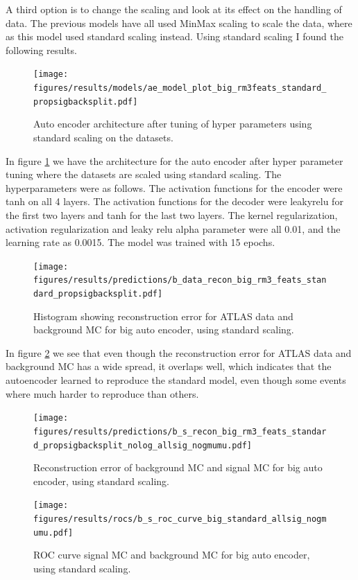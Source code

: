 \documentclass[ reprint, amsmath,amssymb, aps, nofootinbib]{revtex4-2}
\begin{document}
A third option is to change the scaling and look at its effect on the handling of data. The previous models have all used MinMax scaling to scale the data, where as this model used standard scaling instead. Using standard scaling I found the following results.

\begin{figure}[H]
     \centering
         \texttt{[image: figures/results/models/ae\_model\_plot\_big\_rm3feats\_standard\_propsigbacksplit.pdf]}
         \caption{Auto encoder architecture after tuning of hyper parameters using standard scaling on the datasets. }
     \label{fig:ae_big_standard}
\end{figure}

In figure \ref{fig:ae_big_standard} we have the architecture for the auto encoder after hyper parameter tuning where the datasets are scaled using standard scaling. The hyperparameters were as follows. The activation functions for the encoder were tanh on all 4 layers. The activation functions for the decoder were leakyrelu for the first two layers and tanh for the last two layers. The kernel regularization, activation regularization and leaky relu alpha parameter were all 0.01, and the learning rate as 0.0015. The model was trained with 15 epochs.

\begin{figure}[H]
     \centering
         \texttt{[image: figures/results/predictions/b\_data\_recon\_big\_rm3\_feats\_standard\_propsigbacksplit.pdf]}
         \caption{Histogram showing reconstruction error for ATLAS data and background MC for big auto encoder, using standard scaling.}
     \label{fig:data_b_big_pred_stand}
\end{figure}

In figure \ref{fig:data_b_big_pred_stand} we see that even though the reconstruction error for ATLAS data and background MC has a wide spread, it overlaps well, which indicates that the autoencoder learned to reproduce the standard model, even though some events where much harder to reproduce than others. 

\begin{figure}[H]
    \centering
    \texttt{[image: figures/results/predictions/b\_s\_recon\_big\_rm3\_feats\_standard\_propsigbacksplit\_nolog\_allsig\_nogmumu.pdf]}
    \caption{Reconstruction error of background MC and signal MC for big auto encoder, using standard scaling. }
    \label{fig:s_b_big_pred_stand}
\end{figure}

\begin{figure}[H]
    \centering
         \texttt{[image: figures/results/rocs/b\_s\_roc\_curve\_big\_standard\_allsig\_nogmumu.pdf]}
         \caption{ROC curve signal MC and background MC for big auto encoder, using standard scaling.}
         \label{fig:s_b_big_roc_stand}
\end{figure}
\end{document}
